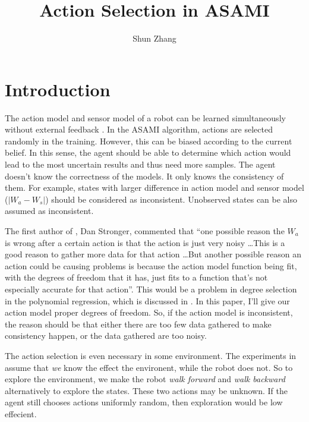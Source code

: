 \documentclass[10pt]{IEEEtran}
\title{Action Selection in ASAMI}
\author{Shun Zhang}
\date{}
\begin{document}
\maketitle


\sloppy

\section{Introduction}

The action model and sensor model of a robot can be learned
simultaneously without external feedback \cite{CSJ06}.  In the ASAMI
algorithm, actions are selected randomly in the training. However,
this can be biased according to the current belief.  In this sense,
the agent should be able to determine which action would lead to the
most uncertain results and thus need more samples.  The agent doesn't
know the correctness of the models. It only knows the consistency of
them. For example, states with larger difference in action model and
sensor model ($|W_a - W_s|$) should be considered as inconsistent.
Unobserved states can be also assumed as inconsistent.

The first author of \cite{CSJ06}, Dan Stronger, commented that ``one
possible reason the $W_a$ is wrong after a certain action is that the
action is just very noisy \ldots This is a good reason to gather more
data for that action \ldots  But another possible reason  an action
could be causing problems is because the action model function being
fit, with the degrees of freedom that it has, just fits to a function
that's not especially accurate for that action''. This would be a
problem in degree selection in the polynomial regression, which is
discussed in \cite{IJAIT08-stronger}. In this paper, I'll give our
action model proper degrees of freedom. So, if the action model is
inconsistent, the reason should be that either there are too few data
gathered to make consistency happen, or the data gathered are too
noisy.

The action selection is even necessary in some environment. The
experiments in \cite{CSJ06} assume that \textit{we} know the effect
the environent, while the robot does not. So to explore the
environment, we make the robot \textit{walk forward} and \textit{walk
backward} alternatively to explore the states. These two actions may
be unknown. If the agent still chooses actions uniformly random, then
exploration would be low effecient.
\end{document}
